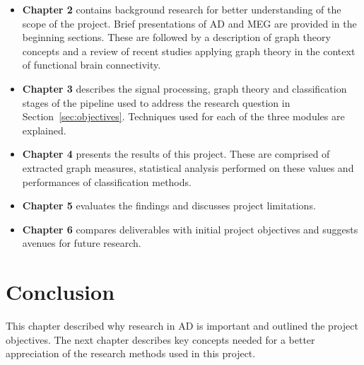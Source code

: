\begin{itemize}
	\item \textbf{Chapter 2} contains background research for better understanding of the scope of the project. Brief presentations of \ac{AD} and \ac{MEG} are provided in the beginning sections. These are followed by a description of graph theory concepts and a review of recent studies applying graph theory in the context of functional brain connectivity.

	\item \textbf{Chapter 3} describes the signal processing, graph theory and classification stages of the pipeline used to address the research question in Section~\ref{sec:objectives}. Techniques used for each of the three modules are explained. 

	\item \textbf{Chapter 4} presents the results of this project. These are comprised of extracted graph measures, statistical analysis performed on these values and performances of classification methods.

	\item \textbf{Chapter 5} evaluates the findings and discusses project limitations. 

	\item \textbf{Chapter 6} compares deliverables with initial project objectives and suggests avenues for future research.   
\end{itemize}

\section*{Conclusion}

This chapter described why research in \ac{AD} is important and outlined the project objectives. The next chapter describes key concepts needed for a better appreciation of the research methods used in this project. 








